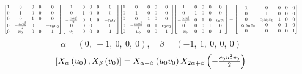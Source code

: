 \documentclass[11pt]{article}
\theoremstyle{definition}
\begin{document}
\[
\scaletoalign{\textwidth}{{\left[\begin{matrix}1 & 0 & 0 & 0 & 0\\0 & 1 & 0 & 0 & 0\\0 & 0 & 1 & 0 & 0\\0 & - \frac{c_{0} u_{0}^{2}}{2} & 0 & 1 & - c_{0} u_{0}\\0 & u_{0} & 0 & 0 & 1\end{matrix}\right]} {\left[\begin{matrix}1 & 0 & 0 & 0 & 0\\0 & 1 & 0 & 0 & 0\\- \frac{c_{0} v_{0}^{2}}{2} & 0 & 1 & 0 & - c_{0} v_{0}\\0 & 0 & 0 & 1 & 0\\v_{0} & 0 & 0 & 0 & 1\end{matrix}\right]} {\left[\begin{matrix}1 & 0 & 0 & 0 & 0\\0 & 1 & 0 & 0 & 0\\0 & 0 & 1 & 0 & 0\\0 & - \frac{c_{0} u_{0}^{2}}{2} & 0 & 1 & c_{0} u_{0}\\0 & - u_{0} & 0 & 0 & 1\end{matrix}\right]} {\left[\begin{matrix}1 & 0 & 0 & 0 & 0\\0 & 1 & 0 & 0 & 0\\- \frac{c_{0} v_{0}^{2}}{2} & 0 & 1 & 0 & c_{0} v_{0}\\0 & 0 & 0 & 1 & 0\\- v_{0} & 0 & 0 & 0 & 1\end{matrix}\right]} = {\left[\begin{matrix}1 & 0 & 0 & 0 & 0\\0 & 1 & 0 & 0 & 0\\0 & c_{0} u_{0} v_{0} & 1 & 0 & 0\\- c_{0} u_{0} v_{0} & 0 & 0 & 1 & 0\\0 & 0 & 0 & 0 & 1\end{matrix}\right]}}
\]
\[
\alpha = \left( 0, \  -1, \  0, \  0, \  0\right), \quad \beta = \left( -1, \  1, \  0, \  0, \  0\right)
\]
\[
\scaletoalign{\textwidth}{\left[ X_{\alpha}\left(u_{0}\right), X_{\beta}\left(v_{0}\right) \right] = X_{\alpha + \beta}\left(u_{0} v_{0}\right) X_{2\alpha + \beta}\left(- \frac{c_{0} u_{0}^{2} v_{0}}{2}\right)}
\]
\end{document}
